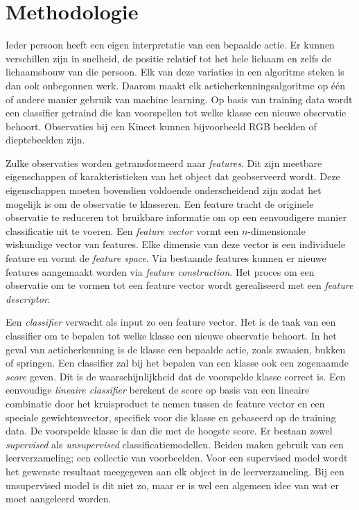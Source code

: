 \chapter{Methodologie}
\label{ch:methodologie}

Ieder persoon heeft een eigen interpretatie van een bepaalde actie. Er kunnen verschillen zijn in snelheid, de positie relatief tot het hele lichaam en zelfs de lichaamsbouw van die persoon. Elk van deze variaties in een algoritme steken is dan ook onbegonnen werk. Daarom maakt elk actieherkenningsalgoritme op één of andere manier gebruik van machine learning. Op basis van training data wordt een classifier getraind die kan voorspellen tot welke klasse een nieuwe observatie behoort. Observaties bij een Kinect kunnen bijvoorbeeld RGB beelden of dieptebeelden zijn. 

Zulke observaties worden getransformeerd naar \textit{features}. Dit zijn meetbare eigenschappen of karakteristieken van het object dat geobserveerd wordt. Deze eigenschappen moeten bovendien voldoende onderscheidend zijn zodat het mogelijk is om de observatie te klasseren. Een feature tracht de originele observatie te reduceren tot bruikbare informatie om op een eenvoudigere manier classificatie uit te voeren. Een \textit{feature vector} vormt een $n$-dimensionale wiskundige vector van features. Elke dimensie van deze vector is een individuele feature en vormt de \textit{feature space}. Via bestaande features kunnen er nieuwe features aangemaakt worden via \textit{feature construction}. Het proces om een observatie om te vormen tot een feature vector wordt gerealiseerd met een \textit{feature descriptor}.

Een \textit{classifier} verwacht als input zo een feature vector. Het is de taak van een classifier om te bepalen tot welke klasse een nieuwe observatie behoort. In het geval van actieherkenning is de klasse een bepaalde actie, zoals zwaaien, bukken of springen. Een classifier zal bij het bepalen van een klasse ook een zogenaamde \textit{score} geven. Dit is de waarschijnlijkheid dat de voorspelde klasse correct is. Een eenvoudige \textit{lineaire classifier} berekent de score op basis van een lineaire combinatie door het kruisproduct te nemen tussen de feature vector en een speciale gewichtenvector, specifiek voor die klasse en gebaseerd op de training data. De voorspelde klasse is dan die met de hoogste score. Er bestaan zowel \textit{supervised} als \textit{unsupervised} classificatiemodellen. Beiden maken gebruik van een leerverzameling; een collectie van voorbeelden. Voor een supervised model wordt het gewenste resultaat meegegeven aan elk object in de leerverzameling. Bij een unsupervised model is dit niet zo, maar er is wel een algemeen idee van wat er moet aangeleerd worden.

